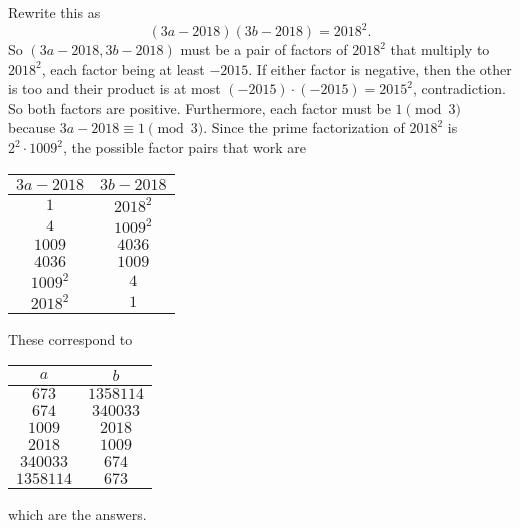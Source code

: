 Rewrite this as \[\left(3a-2018\right)\left(3b-2018\right)=2018^2.\] So $\left(3a-2018,3b-2018\right)$ must be a pair of factors of $2018^2$ that multiply to $2018^2$, each factor being at least $-2015$. If either factor is negative, then the other is too and their product is at most $\left(-2015\right)\cdot\left(-2015\right)=2015^2$, contradiction. So both factors are positive. Furthermore, each factor must be $1\pmod3$ because $3a-2018\equiv1\pmod3$. Since the prime factorization of $2018^2$ is $2^2\cdot1009^2$, the possible factor pairs that work are
\begin{center}
	\begin{tabular}{c|c}
		$3a-2018$ & $3b-2018$ \\\hline
		$1$ & $2018^2$ \\
		$4$ & $1009^2$ \\
		$1009$ & $4036$ \\
		$4036$ & $1009$ \\
		$1009^2$ & $4$ \\
		$2018^2$ & $1$
	\end{tabular}
\end{center}
These correspond to
\begin{center}
	\begin{tabular}{c|c}
		$a$ & $b$ \\\hline
		$673$ & $1358114$ \\
		$674$ & $340033$ \\
		$1009$ & $2018$ \\
		$2018$ & $1009$ \\
		$340033$ & $674$ \\
		$1358114$ & $673$
	\end{tabular}
\end{center}
which are the answers.
